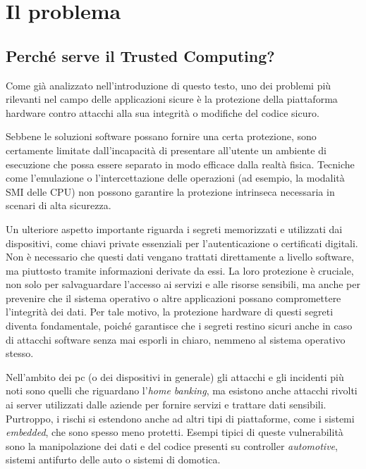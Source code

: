 \chapter{Il problema}\label{ch:il_problema}

\section{Perché serve il Trusted Computing?}\label{sec:perche_tc}
Come già analizzato nell'introduzione di questo testo, uno dei problemi più rilevanti nel campo delle applicazioni sicure è la protezione della piattaforma hardware contro attacchi alla sua integrità o modifiche del codice sicuro.

Sebbene le soluzioni software possano fornire una certa protezione, sono certamente limitate dall'incapacità di presentare all'utente un ambiente di esecuzione che possa essere separato in modo efficace dalla realtà fisica. Tecniche come l'emulazione o l'intercettazione delle operazioni (ad esempio, la modalità SMI delle CPU) non possono garantire la protezione intrinseca necessaria in scenari di alta sicurezza. 

Un ulteriore aspetto importante riguarda i segreti memorizzati e utilizzati dai dispositivi, come chiavi private essenziali per l'autenticazione o certificati digitali. Non è necessario che questi dati vengano trattati direttamente a livello software, ma piuttosto tramite informazioni derivate da essi. La loro protezione è cruciale, non solo per salvaguardare l'accesso ai servizi e alle risorse sensibili, ma anche per prevenire che il sistema operativo o altre applicazioni possano compromettere l'integrità dei dati. Per tale motivo, la protezione hardware di questi segreti diventa fondamentale, poiché garantisce che i segreti restino sicuri anche in caso di attacchi software senza mai esporli in chiaro, nemmeno al sistema operativo stesso.

Nell'ambito dei \acrshort{pc} (o dei dispositivi in generale) gli attacchi e gli incidenti più noti sono quelli che riguardano l'\textit{home banking}, ma esistono anche attacchi rivolti ai server utilizzati dalle aziende per fornire servizi e trattare dati sensibili. Purtroppo, i rischi si estendono anche ad altri tipi di piattaforme, come i sistemi \textit{embedded}, che sono spesso meno protetti. Esempi tipici di queste vulnerabilità sono la manipolazione dei dati e del codice presenti su controller \textit{automotive}, sistemi antifurto delle auto o sistemi di domotica.

